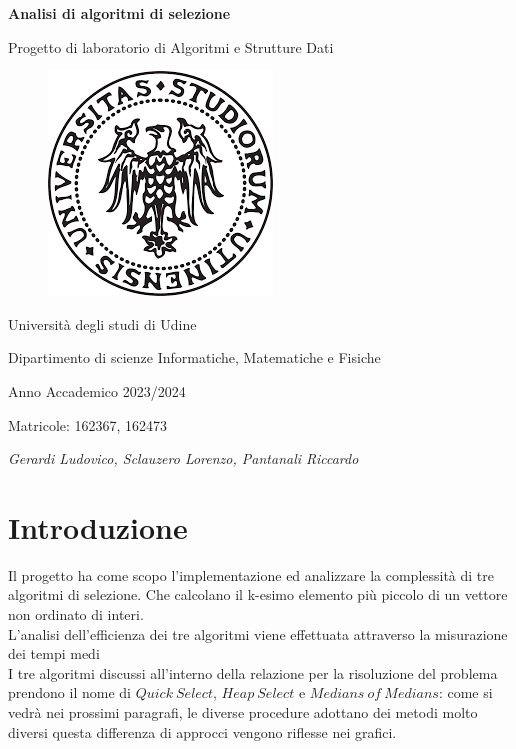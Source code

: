 \documentclass[a4paper]{article}
\begin{document}
\begin{titlepage} %
    \begin{center}
        \vspace*{1cm}
        {\Huge\bfseries Analisi di algoritmi di selezione\par}
        \vspace{.5cm}
        {\LARGE Progetto di laboratorio di Algoritmi e Strutture Dati\par}
        \vspace{1cm}
        \begin{figure}[h]
            \centering
            \includegraphics[width=.5\textwidth]{photo/uniud_logo.png}
        \end{figure}
        \vspace{1.5cm}
        {\LARGE Università degli studi di Udine\par}
        {\LARGE Dipartimento di scienze Informatiche, Matematiche e Fisiche\par}
        \vfill
        {\Large Anno Accademico 2023/2024\par}
        {\Large Matricole: 162367, 162473\par}
        {\Large\itshape Gerardi Ludovico, Sclauzero Lorenzo, Pantanali Riccardo\par}
    \end{center}
\end{titlepage}
\newpage
\section{Introduzione}
Il progetto ha come scopo l'implementazione ed analizzare la complessità di tre algoritmi di selezione. Che calcolano il k-esimo elemento più piccolo di un vettore non ordinato di interi.\\
L'analisi dell'efficienza dei tre algoritmi viene effettuata attraverso la misurazione dei tempi medi\\
I tre algoritmi discussi all'interno della relazione per la risoluzione del problema prendono il nome di $Quick\ Select$, $Heap\ Select$ e $Medians\ of\ Medians$: come si vedrà nei prossimi paragrafi, le diverse procedure adottano dei metodi molto diversi questa differenza di approcci vengono riflesse nei grafici.\\
\end{document}
